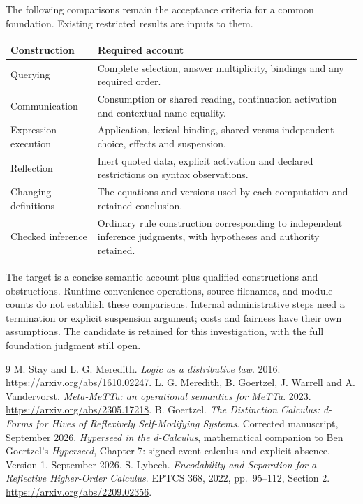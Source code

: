 \documentclass[11pt]{article}
\begin{document}
The following comparisons remain the acceptance criteria for a common
foundation. Existing restricted results are inputs to them.
\begin{center}
\begin{tabularx}{\linewidth}{@{}lX@{}}
\toprule
Construction & Required account \\
\midrule
Querying & Complete selection, answer multiplicity, bindings and any required order. \\
Communication & Consumption or shared reading, continuation activation and contextual name equality. \\
Expression execution & Application, lexical binding, shared versus independent choice, effects and suspension. \\
Reflection & Inert quoted data, explicit activation and declared restrictions on syntax observations. \\
Changing definitions & The equations and versions used by each computation and retained conclusion. \\
Checked inference & Ordinary rule construction corresponding to independent inference judgments, with hypotheses and authority retained. \\
\bottomrule
\end{tabularx}
\end{center}

The target is a concise semantic account plus qualified constructions and
obstructions. Runtime convenience operations, source filenames, and
module counts do not establish these comparisons. Internal administrative
steps need a termination or explicit suspension argument; costs and
fairness have their own assumptions. The candidate is retained for this
investigation, with the full foundation judgment still open.

\begin{thebibliography}{9}
M. Stay and L. G. Meredith.
\emph{Logic as a distributive law}. 2016.
\url{https://arxiv.org/abs/1610.02247}.
L. G. Meredith, B. Goertzel, J. Warrell and A. Vandervorst.
\emph{Meta-MeTTa: an operational semantics for MeTTa}. 2023.
\url{https://arxiv.org/abs/2305.17218}.
B. Goertzel. \emph{The Distinction Calculus: d-Forms for Hives of
Reflexively Self-Modifying Systems}. Corrected manuscript, September 2026.
\emph{Hyperseed in the d-Calculus}, mathematical companion to Ben Goertzel's
\emph{Hyperseed}, Chapter 7: signed event calculus and explicit absence.
Version 1, September 2026.
S. Lybech. \emph{Encodability and Separation for a Reflective Higher-Order
Calculus}. EPTCS 368, 2022, pp.\ 95--112, Section 2.
\url{https://arxiv.org/abs/2209.02356}.
\end{thebibliography}
\end{document}
